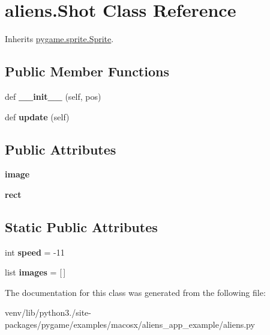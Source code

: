 \hypertarget{classaliens_1_1_shot}{}\section{aliens.\+Shot Class Reference}
\label{classaliens_1_1_shot}


Inherits \hyperlink{classpygame_1_1sprite_1_1_sprite}{pygame.\+sprite.\+Sprite}.

\subsection*{Public Member Functions}
\begin{DoxyCompactItemize}
\item 
\mbox{\label{classaliens_1_1_shot_ae848c9603f90c78b1b012b85bd245cec}} 
def {\bfseries \+\_\+\+\_\+init\+\_\+\+\_\+} (self, pos)
\item 
\mbox{\label{classaliens_1_1_shot_afea27827a9021cda635525cb52a6c7e3}} 
def {\bfseries update} (self)
\end{DoxyCompactItemize}
\subsection*{Public Attributes}
\begin{DoxyCompactItemize}
\item 
\mbox{\label{classaliens_1_1_shot_abb777077f0ac95bd9e19bcac1ede5079}} 
{\bfseries image}
\item 
\mbox{\label{classaliens_1_1_shot_a5f8258db0916413d3020d127c34d368d}} 
{\bfseries rect}
\end{DoxyCompactItemize}
\subsection*{Static Public Attributes}
\begin{DoxyCompactItemize}
\item 
\mbox{\label{classaliens_1_1_shot_a2382fc8300ad3a27b288762c7d30f1c3}} 
int {\bfseries speed} = -\/11
\item 
\mbox{\label{classaliens_1_1_shot_ae3fb24ca6161fc38ff556781b2f37cf8}} 
list {\bfseries images} = \mbox{[}$\,$\mbox{]}
\end{DoxyCompactItemize}


The documentation for this class was generated from the following file\+:\begin{DoxyCompactItemize}
\item 
venv/lib/python3./site-\/packages/pygame/examples/macosx/aliens\+\_\+app\+\_\+example/aliens.\+py\end{DoxyCompactItemize}
